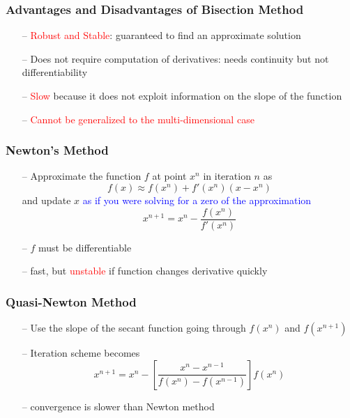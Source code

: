 \documentclass[aspectratio=169, 11pt]{beamer}
\begin{document}
\begin{frame}
\frametitle{Advantages and Disadvantages of Bisection Method}
  \begin{itemize}
    \item[--] \textcolor{red}{Robust and Stable}: guaranteed to find an approximate solution
    \bigskip
    \item[--] Does not require computation of derivatives: needs continuity but not differentiability
    \bigskip
    \item[--] \textcolor{red}{Slow} because it does not exploit information on the slope of the function
    \bigskip
    \item[--] \textcolor{red}{Cannot be generalized to the multi-dimensional case}
  \end{itemize}
\end{frame}

\begin{frame}
\frametitle{Newton's Method}
  \begin{itemize}
    \item[--] Approximate the function $f$ at point $x^{n}$ in iteration $n$ as
    \[
      f\left(x\right)\approx f\left(x^{n}\right)+f'\left(x^{n}\right)\left(x-x^{n}\right)
    \]
    and update $x$ \textcolor{blue}{as if you were solving for a zero of the approximation}
    \[
      x^{n+1}=x^{n}-\frac{f\left(x^{n}\right)}{f'\left(x^{n}\right)}
    \]
    \bigskip
    \item[--] $f$ must be differentiable
    \bigskip
    \item[--] fast, but \textcolor{red}{unstable} if function changes derivative quickly
  \end{itemize}
\end{frame}

\begin{frame}
\frametitle{Quasi-Newton Method}
  \begin{itemize}
    \item[--] Use the slope of the secant function going through $f\left(x^{n}\right)$ and $f\left(x^{n+1}\right)$
    \bigskip
    \item[--] Iteration scheme becomes
    \[
      x^{n+1}=x^{n}-\left[\frac{x^{n}-x^{n-1}}{f\left(x^{n}\right)-f\left(x^{n-1}\right)}\right]f\left(x^{n}\right)
    \]
    \bigskip
    \item[--] convergence is slower than Newton method
  \end{itemize}
\end{frame}
\end{document}
